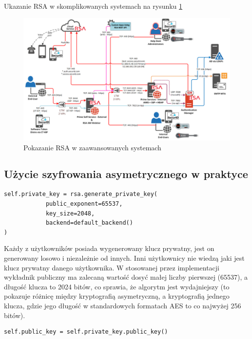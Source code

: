 Ukazanie RSA w skomplikowanych systemach na rysunku \ref{fig:RSASieci}
\begin{figure}[H]
    \centering
    \includegraphics[width=\textwidth]{Images/RSASieci.png}
    \caption{Pokazanie RSA w zaawansowanych systemach}
    \label{fig:RSASieci}
\end{figure}

\subsection{Użycie szyfrowania asymetrycznego w praktyce}
\begin{lstlisting}
self.private_key = rsa.generate_private_key(
            public_exponent=65537,
            key_size=2048,
            backend=default_backend()
)
\end{lstlisting}

Każdy z użytkowników posiada wygenerowany klucz prywatny, jest on generowany losowo i niezależnie od innych. Inni użytkownicy nie wiedzą jaki jest klucz prywatny danego użytkownika. W stosowanej przez implementacji wykładnik publiczny ma zalecaną wartość dosyć małej liczby pierwszej (65537), a długość klucza to 2024 bitów, co sprawia, że algorytm jest wydajniejszy (to pokazuje różnicę między kryptografią asymetryczną, a kryptografią jednego klucza, gdzie jego długość w standardowych formatach AES to co najwyżej 256 bitów).

\begin{lstlisting}
self.public_key = self.private_key.public_key()
\end{lstlisting}

